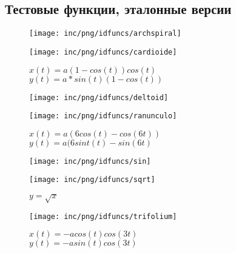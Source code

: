 \subsection{Тестовые функции, эталонные версии }
\begin{figure}
	\begin{minipage}{0.45\textwidth}
		\texttt{[image: inc/png/idfuncs/archspiral]}
		\caption{$x(t)=a*a*cos(t)$\\$y(t)=a*t*sin(t)$}
		\label{fig:func3}
	\end{minipage}
	\begin{minipage}{0,45\textwidth}
		\texttt{[image: inc/png/idfuncs/cardioide]}
		\caption{$x(t)=a(1-cos(t))cos(t)$\\$y(t)=a*sin(t)(1-cos(t))$}
		\label{fig:func4}
	\end{minipage}
\end{figure}

\begin{figure}
	\begin{minipage}{0.45\textwidth}
		\texttt{[image: inc/png/idfuncs/deltoid]}
		\caption{$x(t)=a(2cos(t)+cos(2t)$\\$y(t)=a(2sin(t)-sin(2t)$}
		\label{fig:func5}
	\end{minipage}
	\begin{minipage}{0,45\textwidth}
		\texttt{[image: inc/png/idfuncs/ranunculo]}
		\caption{$x(t)=a(6cos(t)-cos(6t))$\\$y(t)=a(6sint(t)-sin(6t)$}
		\label{fig:func6}
	\end{minipage}
\end{figure}

\begin{figure}
	\begin{minipage}{0.45\textwidth}
		\texttt{[image: inc/png/idfuncs/sin]}
		\caption{$y=sin(x)$}
		\label{fig:func1}
	\end{minipage}
	\begin{minipage}{0,45\textwidth}
		\texttt{[image: inc/png/idfuncs/sqrt]}
		\caption{$y=\sqrt{x}$}
		\label{fig:func2}
	\end{minipage}
\end{figure}


\begin{figure}
\centering
\end{figure}
\begin{figure}
\centering
\texttt{[image: inc/png/idfuncs/trifolium]}
\caption{$x(t)=-acos(t)cos(3t)$\\$y(t)=-asin(t)cos(3t)$}
\label{fig:func7}
\end{figure}

